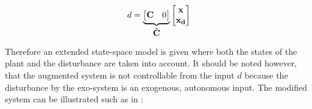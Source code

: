\begin{equation}
\label{eq:ss_dist2}
    d
=
\underbrace{
 \begin{bmatrix}
    \mathbf{C} & 0 
\end{bmatrix}
}_\text{\normalsize{$\tilde{\mathbf{C}}$}}
 \begin{bmatrix}
    \mathbf{x} \\
    \mathbf{x_d}
\end{bmatrix}
\end{equation}

Therefore an extended state-space model is given where both the states of the plant and the disturbance are taken into account. It should be noted however, that the augmented system is not controllable from the input $d$ because the disturbance by the exo-system is an exogenous, autonomous input. The modified system can be illustrated such as in : 



